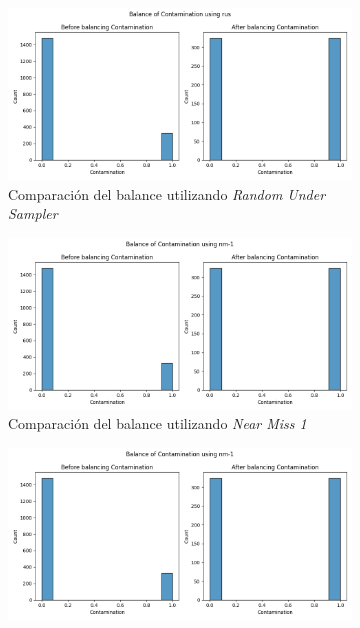 \begin{figure}[!ht]
    \centering
    \begin{subfigure}[b]{0.5\textwidth}
        \centering
        \includegraphics[width=\textwidth]{media/images/under-sampling/rus.png}
        \caption{Comparación del balance utilizando \textit{Random Under Sampler}}
    \end{subfigure}%
    \begin{subfigure}[b]{0.5\textwidth}
        \centering
        \includegraphics[width=\textwidth]{media/images/under-sampling/nm-1.png}
        \caption{Comparación del balance utilizando \textit{Near Miss 1}}
    \end{subfigure}
    \begin{subfigure}[b]{0.5\textwidth}
        \centering
        \includegraphics[width=\textwidth]{media/images/under-sampling/nm-1.png}

\end{subfigure}
\end{figure}
